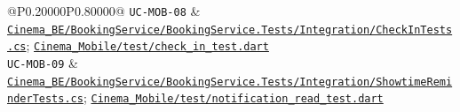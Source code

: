\begin{longtable}{@{}P{0.20000\SRSWidth}P{0.80000\SRSWidth}@{}}
\texttt{UC-\allowbreak{}MOB-\allowbreak{}08} & \href{../../../Cinema\_BE/BookingService/BookingService.Tests/Integration/CheckInTests.cs}{\texttt{Cinema\_\allowbreak{}BE/\allowbreak{}Booking\allowbreak{}Service/\allowbreak{}Booking\allowbreak{}Service.\allowbreak{}Tests/\allowbreak{}Integrat\allowbreak{}ion/\allowbreak{}Check\allowbreak{}In\allowbreak{}Tests.\allowbreak{}cs}}; \href{../../../Cinema\_Mobile/test/check\_in\_test.dart}{\texttt{Cinema\_\allowbreak{}Mobile/\allowbreak{}test/\allowbreak{}check\_\allowbreak{}in\_\allowbreak{}test.\allowbreak{}dart}} \\[3pt]
\texttt{UC-\allowbreak{}MOB-\allowbreak{}09} & \href{../../../Cinema\_BE/BookingService/BookingService.Tests/Integration/ShowtimeReminderTests.cs}{\texttt{Cinema\_\allowbreak{}BE/\allowbreak{}Booking\allowbreak{}Service/\allowbreak{}Booking\allowbreak{}Service.\allowbreak{}Tests/\allowbreak{}Integrat\allowbreak{}ion/\allowbreak{}Showtime\allowbreak{}Reminder\allowbreak{}Tests.\allowbreak{}cs}}; \href{../../../Cinema\_Mobile/test/notification\_read\_test.dart}{\texttt{Cinema\_\allowbreak{}Mobile/\allowbreak{}test/\allowbreak{}notifica\allowbreak{}tion\_\allowbreak{}read\_\allowbreak{}test.\allowbreak{}dart}} \\[3pt]
\end{longtable}
\endgroup
